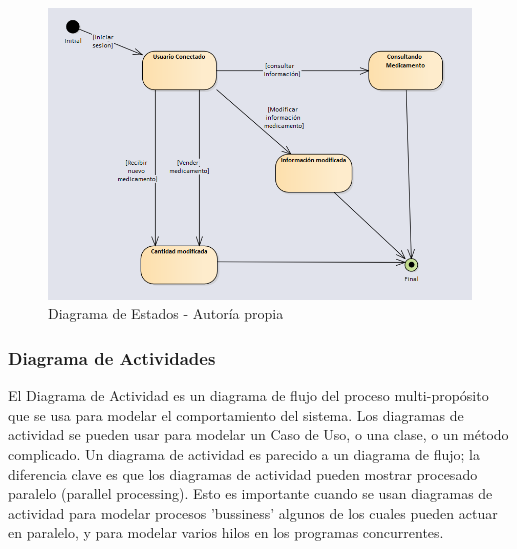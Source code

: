 \begin{center}
    \begin{figure}[htb]
        \centering
        \includegraphics[width = 0.8\linewidth] {libro/capitulo5/img/Estados.png}
        \caption{Diagrama de Estados - Autor\'ia propia}
    \end{figure}
\end{center}
\subsubsection{ Diagrama de Actividades}

El Diagrama de Actividad es un diagrama de flujo del proceso multi-propósito que se usa para modelar el comportamiento del sistema. Los diagramas de actividad se pueden usar para modelar un Caso de Uso, o una clase, o un método complicado.
\newline
Un diagrama de actividad es parecido a un diagrama de flujo; la diferencia clave es que los diagramas de actividad pueden mostrar procesado paralelo (parallel processing). Esto es importante cuando se usan diagramas de actividad para modelar procesos 'bussiness' algunos de los cuales pueden actuar en paralelo, y para modelar varios hilos en los programas concurrentes.

